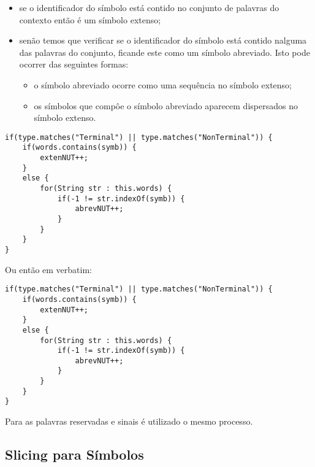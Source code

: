 \documentclass[a4paper,11pt]{article}
\begin{document}
\begin{itemize}
\item se o identificador do símbolo está contido no conjunto de palavras do contexto então é um símbolo extenso;
\item senão temos que verificar se o identificador do símbolo está contido nalguma das palavras do conjunto, ficande este como um símbolo abreviado. Isto pode ocorrer das seguintes formas:
\begin{itemize}
\item o símbolo abreviado ocorre como uma sequência no símbolo extenso;
\item os símbolos que compôe o símbolo abreviado aparecem dispersados no símbolo extenso.\\
\end{itemize}
\end{itemize}

\begin{small}
\begin{lstlisting}
if(type.matches("Terminal") || type.matches("NonTerminal")) {
    if(words.contains(symb)) {
        extenNUT++;
    }
    else {
        for(String str : this.words) {
            if(-1 != str.indexOf(symb)) {
                abrevNUT++;
            }
        }
    }
}
\end{lstlisting}
\end{small}

\begin{LARGE}Ou então em verbatim:\end{LARGE}

\begin{small}
\begin{verbatim}
if(type.matches("Terminal") || type.matches("NonTerminal")) {
    if(words.contains(symb)) {
        extenNUT++;
    }
    else {
        for(String str : this.words) {
            if(-1 != str.indexOf(symb)) {
                abrevNUT++;
            }
        }
    }
}
\end{verbatim}
\end{small}

Para as palavras reservadas e sinais é utilizado o mesmo processo.\\

\subsection{\large Slicing para Símbolos}
\end{document}
